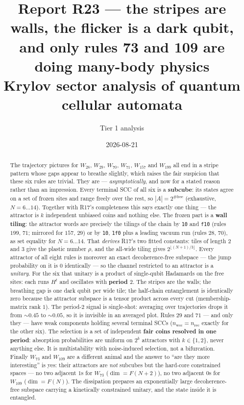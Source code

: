 \documentclass[11pt]{article}
\title{\textbf{Report R23 --- the stripes are walls, the flicker is a dark
qubit, and only rules 73 and 109 are doing many-body physics}\\
\large Krylov sector analysis of quantum cellular automata}
\author{Tier 1 analysis}
\date{2026-08-21}
\newcommand{\rt}[1]{\texttt{#1}}
\theoremstyle{plain}
\begin{document}
\maketitle

\begin{abstract}
The trajectory pictures for $W_{28}$, $W_{29}$, $W_{70}$, $W_{71}$, $W_{157}$
and $W_{199}$ all end in a stripe pattern whose gaps appear to breathe slightly,
which raises the fair suspicion that these six rules are trivial. They are ---
\emph{asymptotically}, and now for a stated reason rather than an impression.
Every terminal SCC of all six is a \textbf{subcube}: its states agree on a set of
frozen sites and range freely over the rest, so $|A|=2^{\#\mathrm{free}}$
(exhaustive, $N=6\ldots14$). Together with R17's completeness this says exactly
one thing --- the attractor is $k$ independent unbiased coins and nothing else.
The frozen part is a \textbf{wall tiling}: the attractor words are precisely the
tilings of the chain by \rt{10} and \rt{f10} (rules $199$, $71$; mirrored for
$157$, $29$) or by \rt{10}, \rt{1f0} plus a leading vacuum run (rules $28$,
$70$), as set equality for $N=6\ldots14$. That \emph{derives} R17's two fitted
constants: tiles of length $2$ and $3$ give the plastic number $\rho$, and the
all-wide tiling gives $2^{\lfloor(N+1)/3\rfloor}$. Every attractor of all eight
rules is moreover an exact decoherence-free subspace --- the jump probability on
it is $0$ identically --- so the channel restricted to an attractor is a
\emph{unitary}. For the six that unitary is a product of single-qubit Hadamards
on the free sites: each runs $H^t$ and oscillates with \textbf{period $2$}. The
stripes are the walls; the breathing gap is one dark qubit per wide tile; the
half-chain entanglement is identically zero because the attractor subspace is a
tensor product across every cut (membership-matrix rank $1$). The period-$2$
signal is single-shot: averaging over trajectories drops it from $\sim0.45$ to
$\sim0.05$, so it is invisible in an averaged plot. Rules $29$ and $71$ --- and
only they --- have weak components holding several terminal SCCs
($n_\mathrm{wcc}=n_\mathrm{rec}$ exactly for the other six). The selection is a
set of independent \textbf{fair coins resolved in one period}: absorption
probabilities are uniform on $2^k$ attractors with $k\in\{1,2\}$, never anything
else. It is multistability with noise-induced selection, not a bifurcation.
Finally $W_{73}$ and $W_{109}$ are a different animal and the answer to
``are they more interesting'' is yes: their attractors are \emph{not} subcubes
but the hard-core constrained spaces --- no two adjacent $1$s for $W_{73}$
($\dim=F(N+2)$), no two adjacent $0$s for $W_{109}$ ($\dim=F(N)$). The
dissipation prepares an exponentially large decoherence-free subspace carrying a
kinetically constrained unitary, and the state inside it is entangled.
\end{abstract}
\end{document}
